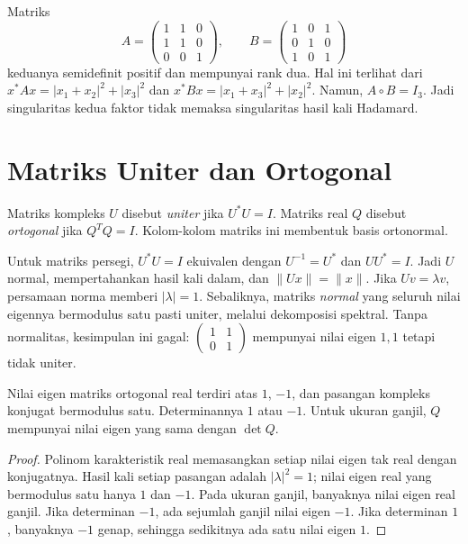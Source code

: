 \begin{exam}
    Matriks
    \[
        A=\begin{pmatrix}1&1&0\\1&1&0\\0&0&1\end{pmatrix},\qquad
        B=\begin{pmatrix}1&0&1\\0&1&0\\1&0&1\end{pmatrix}
    \]
    keduanya semidefinit positif dan mempunyai rank dua. Hal ini
    terlihat dari
    $x^*Ax=|x_1+x_2|^2+|x_3|^2$ dan
    $x^*Bx=|x_1+x_3|^2+|x_2|^2$.
    Namun, $A\circ B=I_3$. Jadi singularitas kedua faktor tidak
    memaksa singularitas hasil kali Hadamard.
\end{exam}

\section{Matriks Uniter dan Ortogonal}
\label{khusus:uniter}

\begin{definisi}
    Matriks kompleks $U$ disebut \emph{uniter} jika $U^*U=I$.
    Matriks real $Q$ disebut \emph{ortogonal} jika $Q^TQ=I$.
    Kolom-kolom matriks ini membentuk basis ortonormal.
\end{definisi}

Untuk matriks persegi, $U^*U=I$ ekuivalen dengan $U^{-1}=U^*$
dan $UU^*=I$. Jadi $U$ normal, mempertahankan hasil kali dalam,
dan $\|Ux\|=\|x\|$. Jika $Uv=\lambda v$, persamaan norma memberi
$|\lambda|=1$.
Sebaliknya, matriks \emph{normal} yang seluruh nilai eigennya
bermodulus satu pasti uniter, melalui dekomposisi spektral.
Tanpa normalitas, kesimpulan ini gagal: $\begin{pmatrix}1&1\\0&1\end{pmatrix}$
mempunyai nilai eigen $1,1$ tetapi tidak uniter.

\begin{prop}
    \label{khusus:ortogonal-real}
    Nilai eigen matriks ortogonal real terdiri atas $1$, $-1$,
    dan pasangan kompleks konjugat bermodulus satu.
    Determinannya $1$ atau $-1$. Untuk ukuran ganjil, $Q$
    mempunyai nilai eigen yang sama dengan $\det Q$.
\end{prop}
\begin{proof}
    Polinom karakteristik real memasangkan setiap nilai eigen
    tak real dengan konjugatnya. Hasil kali setiap pasangan adalah
    $|\lambda|^2=1$; nilai eigen real yang bermodulus satu hanya
    $1$ dan $-1$. Pada ukuran ganjil, banyaknya nilai eigen real
    ganjil. Jika determinan $-1$, ada sejumlah ganjil nilai eigen
    $-1$. Jika determinan $1$, banyaknya $-1$ genap, sehingga
    sedikitnya ada satu nilai eigen $1$.
\end{proof}


